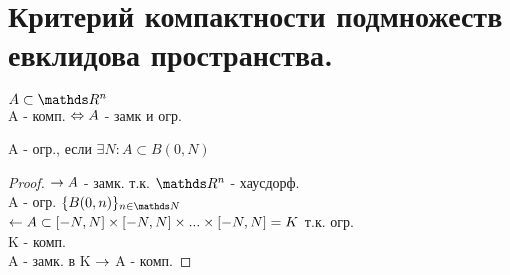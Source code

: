 \documentclass[geometry.tex]{subfiles}
\begin{document}
  \section{Критерий компактности подмножеств евклидова пространства.}

  \begin{theorem}
      $A \subset \R^n$\\
      A - комп. $\Leftrightarrow A$ - замк и огр.
  \end{theorem}

  \begin{definition}
      A - огр., если $\exists N: A \subset B(0, N)$
  \end{definition}

  \begin{proof}
      $\rightarrow A$ - замк. т.к. $\R^n$ - хаусдорф.\\
      A - огр. \q $\{B(0, n)\}_{n \in \N}$\\
      $\leftarrow A \subset [-N, N] \times [-N, N] \times ... \times [-N, N] = K$ т.к. огр.\\
      K - комп.\\
      A - замк. в K $\rightarrow$ A - комп.
  \end{proof}
\end{document}
